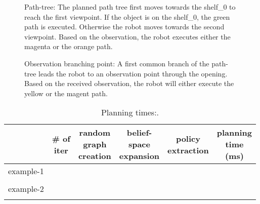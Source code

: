 \documentclass[letterpaper, 10 pt, conference]{ieeeconf}  %
\begin{document}
\begin{figure}[!htb]
 \caption{Path-tree: The planned path tree first moves towards the shelf\_0 to reach the first viewpoint. If the object is on the shelf\_0, the green path is executed. Otherwise the robot moves towards the second viewpoint. Based on the observation, the robot executes either the magenta or the orange path.}
 \label{fig:example_1_path_tree}
\end{figure}

\begin{figure}[!htb]
 \caption{Observation branching point: A first common branch of the path-tree leads the robot to an observation point through the opening. Based on the received observation, the robot will either execute the yellow or the magent path.}
 \label{fig:example_2_view_point}
\end{figure}






\begin{table}[h]
\begin{center}
\begin{tabular}{|c||c|c|c|c||c|}
\hline
  & \thead{\# of\\ iter} & \thead{random\\graph\\creation} & \thead{belief-\\space\\expansion} & \thead{policy\\ extraction} & \thead{planning\\time\\(ms)} \\
\hline
example-1  & & & & &\\
 & & & & &\\
\hline
example-2  & & & & &\\
 & & & & &\\
\hline
\end{tabular}
\end{center}
\caption{Planning times:.}
\label{tab:table_obstacle_avoidance}
\end{table}
\end{document}
